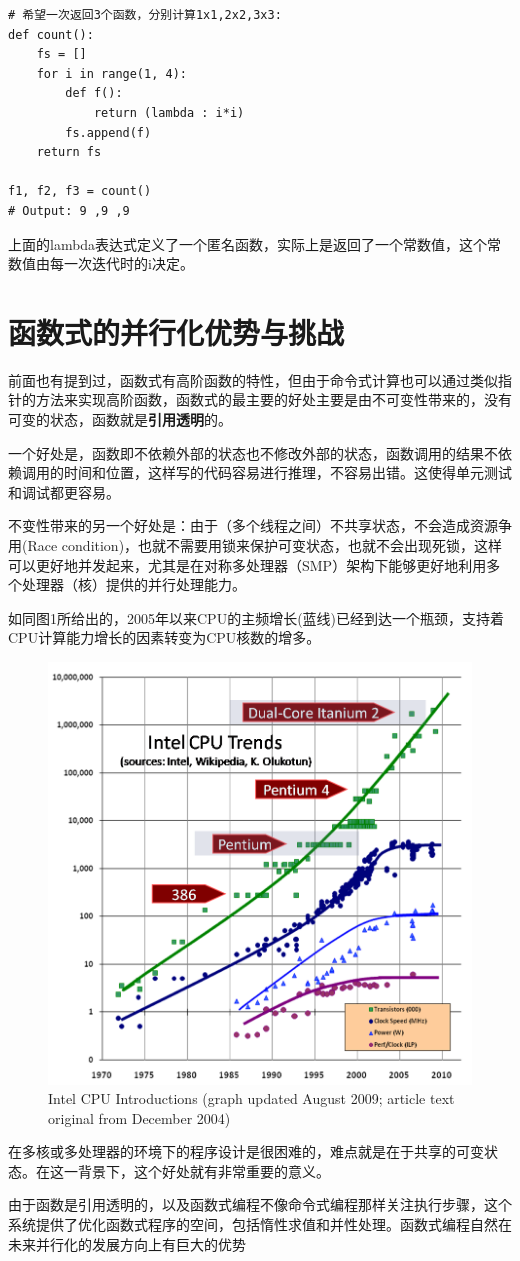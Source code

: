 \documentclass{article}
\begin{document}
\lstset{language=python}
\begin{lstlisting}
# 希望一次返回3个函数，分别计算1x1,2x2,3x3:
def count():
	fs = []
	for i in range(1, 4):
		def f():	
			return (lambda : i*i)		
		fs.append(f)
	return fs

f1, f2, f3 = count()
# Output: 9 ,9 ,9
\end{lstlisting}
		上面的lambda表达式定义了一个匿名函数，实际上是返回了一个常数值，这个常数值由每一次迭代时的i决定。
	
	\section{函数式的并行化优势与挑战}
		前面也有提到过，函数式有高阶函数的特性，但由于命令式计算也可以通过类似指针的方法来实现高阶函数，函数式的最主要的好处主要是由不可变性带来的，没有可变的状态，函数就是\textbf{引用透明}的。
		
		一个好处是，函数即不依赖外部的状态也不修改外部的状态，函数调用的结果不依赖调用的时间和位置，这样写的代码容易进行推理，不容易出错。这使得单元测试和调试都更容易。
		
		不变性带来的另一个好处是：由于（多个线程之间）不共享状态，不会造成资源争用(Race condition)，也就不需要用锁来保护可变状态，也就不会出现死锁，这样可以更好地并发起来，尤其是在对称多处理器（SMP）架构下能够更好地利用多个处理器（核）提供的并行处理能力。
		
		如同图1所给出的，2005年以来CPU的主频增长(蓝线)已经到达一个瓶颈，支持着CPU计算能力增长的因素转变为CPU核数的增多。
		
		\begin{figure}[ht]
			\centering
			\includegraphics[scale=0.6]{CPU.png}
			\caption{Intel CPU Introductions (graph updated August 2009; article text original from December 2004)}
			\label{fig:label}
		\end{figure}
	
		在多核或多处理器的环境下的程序设计是很困难的，难点就是在于共享的可变状态。在这一背景下，这个好处就有非常重要的意义。 
		
		由于函数是引用透明的，以及函数式编程不像命令式编程那样关注执行步骤，这个系统提供了优化函数式程序的空间，包括惰性求值和并性处理。函数式编程自然在未来并行化的发展方向上有巨大的优势
	
\end{document}
